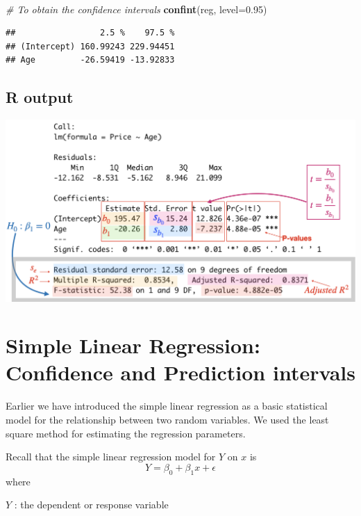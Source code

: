 \documentclass[
]{article}
\newenvironment{Shaded}{\begin{snugshade}}{\end{snugshade}}
\newcommand{\AttributeTok}[1]{\textcolor[rgb]{0.13,0.29,0.53}{#1}}
\newcommand{\CommentTok}[1]{\textcolor[rgb]{0.56,0.35,0.01}{\textit{#1}}}
\newcommand{\FloatTok}[1]{\textcolor[rgb]{0.00,0.00,0.81}{#1}}
\newcommand{\FunctionTok}[1]{\textcolor[rgb]{0.13,0.29,0.53}{\textbf{#1}}}
\newcommand{\NormalTok}[1]{#1}
\begin{document}
\(~\)

\begin{Shaded}
\begin{Highlighting}[]
\CommentTok{\# To obtain the confidence intervals }
\FunctionTok{confint}\NormalTok{(reg, }\AttributeTok{level=}\FloatTok{0.95}\NormalTok{)}
\end{Highlighting}
\end{Shaded}

\begin{verbatim}
##                 2.5 %    97.5 %
## (Intercept) 160.99243 229.94451
## Age         -26.59419 -13.92833
\end{verbatim}

\hypertarget{r-output}{%
\subsection{R output}\label{r-output}}

\begin{center}\includegraphics[width=0.8\linewidth,height=0.8\textheight]{figures/regRoutput} \end{center}

\hypertarget{simple-linear-regression-confidence-and-prediction-intervals}{%
\section{Simple Linear Regression: Confidence and Prediction
intervals}\label{simple-linear-regression-confidence-and-prediction-intervals}}

Earlier we have introduced the simple linear regression as a basic
statistical model for the relationship between two random variables. We
used the least square method for estimating the regression parameters.

Recall that the simple linear regression model for \(Y\) on \(x\) is
\[Y=\beta_0+\beta_1 x+\epsilon\] where

\(Y\) : the dependent or response variable
\end{document}
